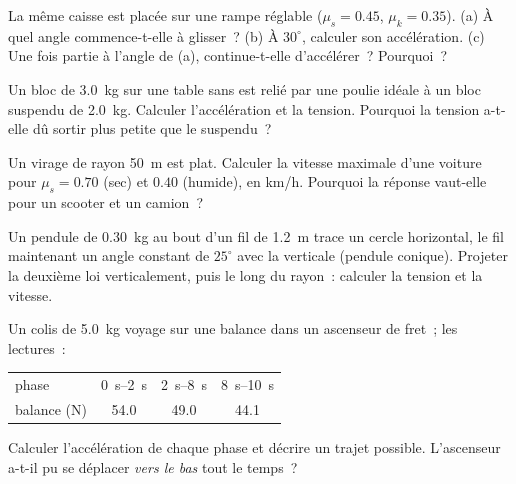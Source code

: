 \begin{exercise}[$\star\star$]\label{exo:g12:newtons-laws:7}
La même caisse est placée sur une rampe réglable ($\mu_s = 0.45$,
$\mu_k = 0.35$). (a) À quel angle commence-t-elle à glisser~?
(b) À $30^\circ$, calculer son accélération.
(c) Une fois partie à l'angle de (a), continue-t-elle d'accélérer~?
Pourquoi~?
\end{exercise}

\begin{exercise}[$\star\star$]\label{exo:g12:newtons-laws:8}
Un bloc de \qty{3.0}{kg} sur une table sans  est relié par une
poulie idéale à un bloc suspendu de \qty{2.0}{kg}. Calculer
l'accélération et la tension. Pourquoi la
tension a-t-elle dû sortir plus petite que le
 suspendu~?
\end{exercise}

\begin{exercise}[$\star\star$]\label{exo:g12:newtons-laws:9}
Un virage de rayon \qty{50}{m} est plat. Calculer la vitesse maximale
d'une voiture pour $\mu_s = 0.70$ (sec) et $0.40$ (humide), en
\unit{km/h}. Pourquoi la réponse vaut-elle pour un scooter et un
camion~?
\end{exercise}

\begin{exercise}[$\star\star$]\label{exo:g12:newtons-laws:10}
Un pendule de \qty{0.30}{kg} au bout d'un fil de \qty{1.2}{m} trace un
cercle horizontal, le fil maintenant un angle constant de $25^\circ$
avec la verticale (pendule conique). Projeter la deuxième loi
verticalement, puis le long du rayon~: calculer la
tension et la vitesse.
\end{exercise}

\begin{exercise}[$\star\star$]\label{exo:g12:newtons-laws:11}
Un colis de \qty{5.0}{kg} voyage sur une balance dans un ascenseur de
fret~; les lectures~:
\begin{center}\small\begin{tabular}{lccc}
phase & \qtyrange{0}{2}{s} & \qtyrange{2}{8}{s} & \qtyrange{8}{10}{s}\\
balance (\unit{N}) & 54.0 & 49.0 & 44.1
\end{tabular}\end{center}
Calculer l'accélération de chaque phase et décrire un trajet possible.
L'ascenseur a-t-il pu se déplacer \emph{vers le bas} tout le temps~?
\end{exercise}

